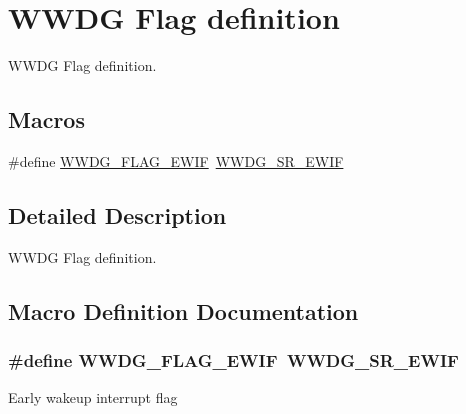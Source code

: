 \hypertarget{group___w_w_d_g___flag__definition}{}\section{W\+W\+DG Flag definition}
\label{group___w_w_d_g___flag__definition}


W\+W\+DG Flag definition.  


\subsection*{Macros}
\begin{DoxyCompactItemize}
\item 
\#define \hyperlink{group___w_w_d_g___flag__definition_gaac081893a320f1216262be063b587edb}{W\+W\+D\+G\+\_\+\+F\+L\+A\+G\+\_\+\+E\+W\+IF}~\hyperlink{group___peripheral___registers___bits___definition_ga96cf9ddd91b6079c5aceef6f3e857b69}{W\+W\+D\+G\+\_\+\+S\+R\+\_\+\+E\+W\+IF}
\end{DoxyCompactItemize}


\subsection{Detailed Description}
W\+W\+DG Flag definition. 



\subsection{Macro Definition Documentation}
\subsubsection[{\texorpdfstring{W\+W\+D\+G\+\_\+\+F\+L\+A\+G\+\_\+\+E\+W\+IF}{WWDG_FLAG_EWIF}}]{\setlength{\rightskip}{0pt plus 5cm}\#define W\+W\+D\+G\+\_\+\+F\+L\+A\+G\+\_\+\+E\+W\+IF~{\bf W\+W\+D\+G\+\_\+\+S\+R\+\_\+\+E\+W\+IF}}\hypertarget{group___w_w_d_g___flag__definition_gaac081893a320f1216262be063b587edb}{}\label{group___w_w_d_g___flag__definition_gaac081893a320f1216262be063b587edb}
Early wakeup interrupt flag 